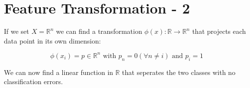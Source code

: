\section*{Feature Transformation - 2} 
If we set $X = \mathds{R}^n$ we can find a transformation $\phi(x) : \mathds{R} \to \mathds{R}^n$ that projects each data point in its own dimension:

\begin{equation}
    \phi(x_i) = p \in \mathds{R}^n \text{ with } p_n = 0 (\forall n \neq i) \text{ and } p_i = 1 
\end{equation}

We can now find a linear function in $\mathds{R}$ that seperates the two classes with no classification errors.